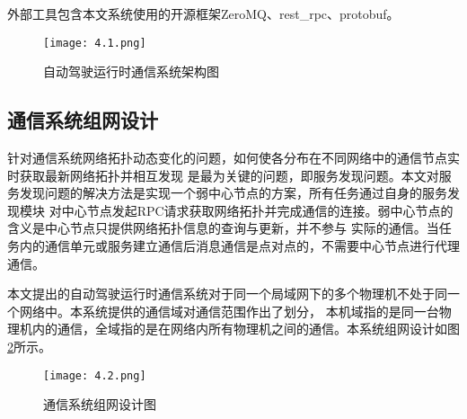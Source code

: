 外部工具包含本文系统使用的开源框架ZeroMQ、rest\_rpc、protobuf。

\begin{figure}[htb]
    \centering
    \texttt{[image: 4.1.png]}
    \caption{自动驾驶运行时通信系统架构图}
    \label{communication_system_structure_gaiyao}
  \end{figure}

\subsection{通信系统组网设计}
针对通信系统网络拓扑动态变化的问题，如何使各分布在不同网络中的通信节点实时获取最新网络拓扑并相互发现
是最为关键的问题，即服务发现问题。本文对服务发现问题的解决方法是实现一个弱中心节点的方案，所有任务通过自身的服务发现模块
对中心节点发起RPC请求获取网络拓扑并完成通信的连接。弱中心节点的含义是中心节点只提供网络拓扑信息的查询与更新，并不参与
实际的通信。当任务内的通信单元或服务建立通信后消息通信是点对点的，不需要中心节点进行代理通信。

本文提出的自动驾驶运行时通信系统对于同一个局域网下的多个物理机不处于同一个网络中。本系统提供的通信域对通信范围作出了划分，
本机域指的是同一台物理机内的通信，全域指的是在网络内所有物理机之间的通信。本系统组网设计如图\ref{communication_system_network_gaiyao}所示。

\begin{figure}[htb]
  \centering
  \texttt{[image: 4.2.png]}
  \caption{通信系统组网设计图}
  \label{communication_system_network_gaiyao}
\end{figure}

